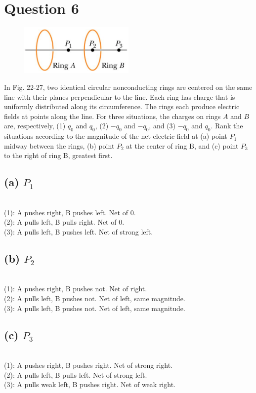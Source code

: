 \documentclass[12pt]{article}
\begin{document}
\section{Question 6}
\begin{figure}
    \vspace{-30pt}
    \includegraphics[width=0.5\textwidth]{picture_2.png} 
\end{figure}
In Fig. 22-27, two identical circular nonconducting rings are centered on the same line with their planes perpendicular to the line. Each ring has charge that is uniformly distributed along its circumference. The rings each produce electric fields at points along the line. For three situations, the charges on rings $A$ and $B$ are, respectively, (1) $q_0$ and $q_0$, (2) $-q_0$ and $-q_0$, and (3) $-q_0$ and $q_0$. Rank the situations according to the magnitude of the net electric field at (a) point $P_1$ midway between the rings, (b) point $P_2$ at the center of ring B, and (c) point $P_3$ to the right of ring B, greatest first.

\subsection{(a) $P_1$}
\\
(1): A pushes right, B pushes left. Net of 0.\\
(2): A pulls left, B pulls right. Net of 0.\\
(3): A pulls left, B pushes left. Net of strong left.

\subsection{(b) $P_2$}
\\
(1): A pushes right, B pushes not. Net of right.\\
(2): A pulls left, B pushes not. Net of left, same magnitude.\\
(3): A pulls left, B pushes not. Net of left, same magnitude.

\subsection{(c) $P_3$}
\\
(1): A pushes right, B pushes right. Net of strong right.\\
(2): A pulls left, B pulls left. Net of strong left.\\
(3): A pulls weak left, B pushes right. Net of weak right.
\end{document}
